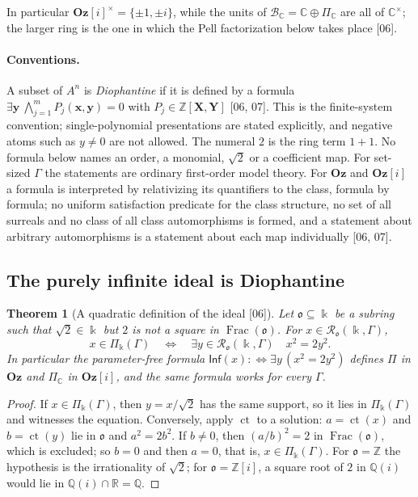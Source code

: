 \documentclass[11pt,oneside]{article}
\numberwithin{equation}{section}
\newtheorem{theorem}{Theorem}[section]
\theoremstyle{definition}
\theoremstyle{remark}
\newcommand{\Oz}{\mathbf{Oz}}
\newcommand{\Z}{\mathbb Z}
\newcommand{\Q}{\mathbb Q}
\newcommand{\R}{\mathbb R}
\newcommand{\C}{\mathbb C}
\newcommand{\BC}{\mathcal B_{\C}}
\newcommand{\ct}{\operatorname{ct}}
\newcommand{\Frac}{\operatorname{Frac}}
\newcommand{\src}[1]{\textup{\textsf{\small[#1]}}}
\newcommand{\Og}{\Oz[i]}
\begin{document}
In particular $\Og^\times=\{\pm1,\pm i\}$, while the units of
$\BC=\C\oplus\Pi_{\C}$ are all of $\C^\times$; the larger ring is the one in
which the Pell factorization below takes place \src{06}.

\paragraph{Conventions.} A subset of $A^n$ is \emph{Diophantine} if it is
defined by a formula
$\exists\mathbf y\ \bigwedge_{j=1}^mP_j(\mathbf x,\mathbf y)=0$ with
$P_j\in\Z[\mathbf X,\mathbf Y]$ \src{06, 07}. This is the finite-system
convention; single-polynomial presentations are stated explicitly, and
negative atoms such as $y\ne0$ are not allowed. The numeral $2$ is the ring
term $1+1$. No formula below names an order, a monomial, $\sqrt2$ or a
coefficient map. For set-sized $\Gamma$ the statements are ordinary
first-order model theory. For $\Oz$ and $\Og$ a formula is interpreted by
relativizing its quantifiers to the class, formula by formula; no uniform
satisfaction predicate for the class structure, no set of all surreals and no
class of all class automorphisms is formed, and a statement about arbitrary
automorphisms is a statement about each map individually \src{06, 07}.

\subsection{The purely infinite ideal is Diophantine}

\begin{theorem}[A quadratic definition of the ideal \src{06}]\label{odg:def:thm:ideal}
Let $\mathfrak o\subseteq\Bbbk$ be a subring such that $\sqrt2\in\Bbbk$ but
$2$ is not a square in $\Frac(\mathfrak o)$. For
$x\in\mathcal R_{\mathfrak o}(\Bbbk,\Gamma)$,
\begin{equation}\label{odg:def:eq:ideal}
 x\in\Pi_\Bbbk(\Gamma)\quad\Longleftrightarrow\quad
 \exists y\in\mathcal R_{\mathfrak o}(\Bbbk,\Gamma)\quad x^2=2y^2 .
\end{equation}
In particular the parameter-free formula
$\mathsf{Inf}(x):\Leftrightarrow\exists y\,(x^2=2y^2)$ defines $\Pi$ in $\Oz$
and $\Pi_{\C}$ in $\Og$, and the same formula works for every $\Gamma$.
\end{theorem}
\begin{proof}
If $x\in\Pi_\Bbbk(\Gamma)$, then $y=x/\sqrt2$ has the same support, so it lies
in $\Pi_\Bbbk(\Gamma)$ and witnesses the equation. Conversely, apply $\ct$ to
a solution: $a=\ct(x)$ and $b=\ct(y)$ lie in $\mathfrak o$ and $a^2=2b^2$. If
$b\ne0$, then $(a/b)^2=2$ in $\Frac(\mathfrak o)$, which is excluded; so $b=0$
and then $a=0$, that is, $x\in\Pi_\Bbbk(\Gamma)$. For $\mathfrak o=\Z$ the
hypothesis is the irrationality of $\sqrt2$; for $\mathfrak o=\Z[i]$, a square
root of $2$ in $\Q(i)$ would lie in $\Q(i)\cap\R=\Q$.
\end{proof}
\end{document}
